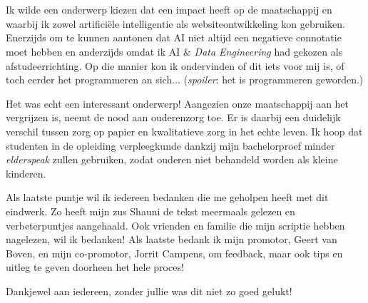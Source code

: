 
\chapter*{}
\label{ch:voorwoord}


Ik wilde een onderwerp kiezen dat een impact heeft op de maatschappij en waarbij ik zowel artificiële intelligentie als websiteontwikkeling kon gebruiken. Enerzijds om te kunnen aantonen dat AI niet altijd een negatieve connotatie moet hebben en anderzijds omdat ik AI \& \textit{Data Engineering} had gekozen als afstudeerrichting. Op die manier kon ik ondervinden of dit iets voor mij is, of toch eerder het programmeren an sich$\ldots$ (\textit{spoiler}: het is programmeren geworden.)

Het was echt een interessant onderwerp! Aangezien onze maatschappij aan het vergrijzen is, neemt de nood aan ouderenzorg toe. Er is daarbij een duidelijk verschil tussen zorg op papier en kwalitatieve zorg in het echte leven. Ik hoop dat studenten in de opleiding verpleegkunde dankzij mijn bachelorproef minder \textit{elderspeak} zullen gebruiken, zodat ouderen niet behandeld worden als kleine kinderen.

Als laatste puntje wil ik iedereen bedanken die me geholpen heeft met dit eindwerk. Zo heeft mijn zus Shauni de tekst meermaals gelezen en verbeterpuntjes aangehaald. Ook vrienden en familie die mijn scriptie hebben nagelezen, wil ik bedanken!
Als laatste bedank ik mijn promotor, Geert van Boven, en mijn co-promotor, Jorrit Campens, om feedback, maar ook tips en uitleg te geven doorheen het hele proces!

Dankjewel aan iedereen, zonder jullie was dit niet zo goed gelukt!